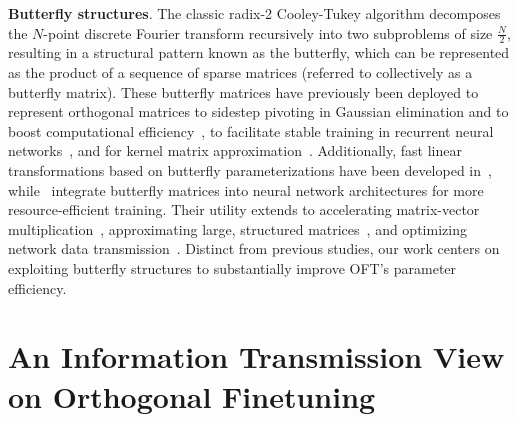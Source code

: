 \textbf{Butterfly structures}. The classic radix-2 Cooley-Tukey algorithm decomposes the $N$-point discrete Fourier transform recursively into two subproblems of size $\frac{N}{2}$, resulting in a structural pattern known as the butterfly, which can be represented as the product of a sequence of sparse matrices (referred to collectively as a butterfly matrix). These butterfly matrices have previously been deployed to represent orthogonal matrices to sidestep pivoting in Gaussian elimination and to boost computational efficiency~\cite{parker1995random}, to facilitate stable training in recurrent neural networks~\cite{jing2017tunable}, and for kernel matrix approximation~\cite{munkhoeva2018quadrature}. Additionally, fast linear transformations based on butterfly parameterizations have been developed in~\cite{dao2019learning,dao2019kaleidoscope}, while~\cite{chen2022pixelated,dao2022monarch} integrate butterfly matrices into neural network architectures for more resource-efficient training. Their utility extends to accelerating matrix-vector multiplication~\cite{michielssen1996multilevel,o2010algorithm}, approximating large, structured matrices~\cite{li2015butterfly}, and optimizing network data transmission~\cite{klasing1994broadcasting,li2003linear,rajasingh2016transmission}. Distinct from previous studies, our work centers on exploiting butterfly structures to substantially improve OFT’s parameter efficiency.

\section{An Information Transmission View on Orthogonal Finetuning}


